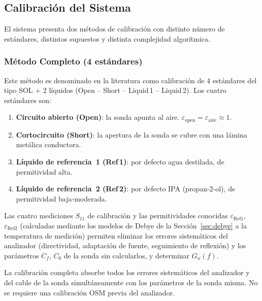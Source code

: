 \newpage
\Encabezado

\subsection{Calibración del Sistema}
\label{sec:calibracion}

El sistema presenta dos métodos de calibración con distinto número de estándares,
distintos supuestos y distinta complejidad algorítmica.

\subsubsection{Método Completo (4 estándares)}
\label{sec:metodo_completo}

Este método es denominado en la literatura como calibración de 4 estándares
del tipo SOL + 2 líquidos (Open -- Short -- Liquid\,1 -- Liquid\,2).
Los cuatro estándares son:

\begin{enumerate}
    \item \textbf{Circuito abierto (Open)}: la sonda apunta al aire.
          $\varepsilon_{\text{open}} = \varepsilon_{\text{aire}} \approx 1$.
    \item \textbf{Cortocircuito (Short)}: la apertura de la sonda se cubre con
          una lámina metálica conductora.
    \item \textbf{Líquido de referencia~1 (Ref\,1)}: por defecto agua destilada,
          de permitividad alta.
    \item \textbf{Líquido de referencia~2 (Ref\,2)}: por defecto IPA (propan-2-ol),
          de permitividad baja-moderada.
\end{enumerate}

Las cuatro mediciones $S_{11}$ de calibración y las permitividades conocidas
$\varepsilon_{\text{Ref1}}$, $\varepsilon_{\text{Ref2}}$ (calculadas mediante
los modelos de Debye de la Sección~\ref{sec:debye} a la temperatura de medición)
permiten eliminar los errores sistemáticos del analizador (directividad,
adaptación de fuente, seguimiento de reflexión) y los parámetros $C_f$, $C_0$ de
la sonda sin calcularlos, y determinar $G_n(f)$.

La calibración completa absorbe todos los errores sistemáticos del analizador y
del cable de la sonda simultáneamente con los parámetros de la sonda misma.
No se requiere una calibración OSM previa del analizador.


